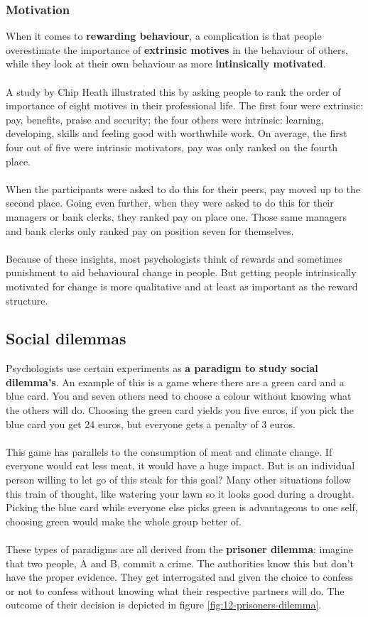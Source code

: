 \documentclass[../summary.tex]{subfiles}
\begin{document}
			\subsubsection{Motivation}
				When it comes to \textbf{rewarding behaviour}, a complication is that people overestimate the importance of \textbf{extrinsic motives} in the behaviour of others, while they look at their own behaviour as more \textbf{intinsically motivated}.\\
				\\
				A study by Chip Heath illustrated this by asking people to rank the order of importance of eight motives in their professional life. The first four were extrinsic: pay, benefits, praise and security; the four others were intrinsic: learning, developing, skills and feeling good with worthwhile work. On average, the first four out of five were intrinsic motivators, pay was only ranked on the fourth place. \\
				\\
				When the participants were asked to do this for their peers, pay moved up to the second place. Going even further, when they were asked to do this for their managers or bank clerks, they ranked pay on place one. Those same managers and bank clerks only ranked pay on position seven for themselves. \\
				\\
				Because of these insights, most psychologists think of rewards and sometimes punishment to aid behavioural change in people. But getting people intrinsically motivated for change is more qualitative and at least as important as the reward structure. 
		\newpage
		\subsection{Social dilemmas}
			Psychologists use certain experiments as \textbf{a paradigm to study social dilemma's}. An example of this is a game where there are a green card and a blue card. You and seven others need to choose a colour without knowing what the others will do. Choosing the green card yields you five euros, if you pick the blue card you get 24 euros, but everyone gets a penalty of 3 euros. \\
			\\
			This game has parallels to the consumption of meat and climate change. If everyone would eat less meat, it would have a huge impact. But is an individual person willing to let go of this steak for this goal? Many other situations follow this train of thought, like watering your lawn so it looks good during a drought. Picking the blue card while everyone else picks green is advantageous to one self, choosing green would make the whole group better of. \\
			\\
			These types of paradigms are all derived from the \textbf{prisoner dilemma}: imagine that two people, A and B, commit a crime. The authorities know this but don't have the proper evidence. They get interrogated and given the choice to confess or not to confess without knowing what their respective partners will do. The outcome of their decision is  depicted in figure \ref{fig:12-prisoners-dilemma}. \\
			
\end{document}
